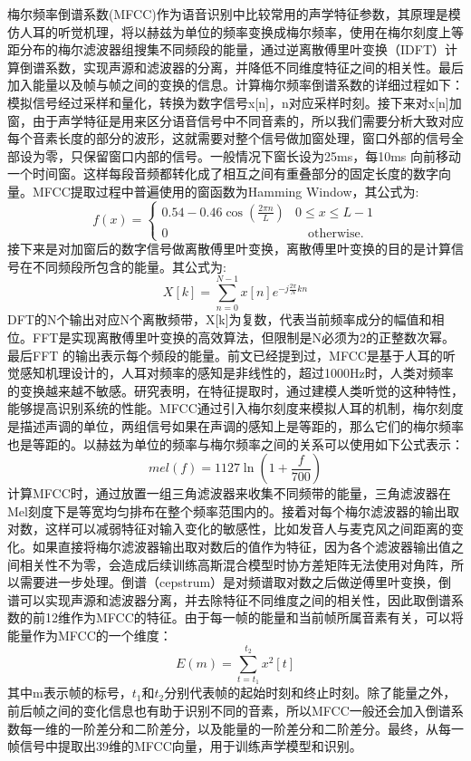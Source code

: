 梅尔频率倒谱系数(MFCC)作为语音识别中比较常用的声学特征参数，其原理是模仿人耳的听觉机理，将以赫兹为单位的频率变换成梅尔频率，使用在梅尔刻度上等距分布的梅尔滤波器组搜集不同频段的能量，通过逆离散傅里叶变换（IDFT）计算倒谱系数，实现声源和滤波器的分离，并降低不同维度特征之间的相关性。最后加入能量以及帧与帧之间的变换的信息。计算梅尔频率倒谱系数的详细过程如下：模拟信号经过采样和量化，转换为数字信号x[n]，n对应采样时刻。接下来对x[n]加窗，由于声学特征是用来区分语音信号中不同音素的，所以我们需要分析大致对应每个音素长度的部分的波形，这就需要对整个信号做加窗处理，窗口外部的信号全部设为零，只保留窗口内部的信号。一般情况下窗长设为25ms，每10ms 向前移动一个时间窗。这样每段音频都转化成了相互之间有重叠部分的固定长度的数字向量。MFCC提取过程中普遍使用的窗函数为Hamming Window，其公式为:
\begin{equation}
  f(x)=
    \begin{cases}
      0.54 - 0.46\cos(\frac{2{\pi}n}{L}) & 0\leq x\leq L-1 \\
      \text{0} &\quad\text{otherwise.} \
    \end{cases}
\end{equation}
接下来是对加窗后的数字信号做离散傅里叶变换，离散傅里叶变换的目的是计算信号在不同频段所包含的能量。其公式为:\begin{equation}X[k]=\sum_{n=0}^{N-1} x[n]{e^{-j\frac{2\pi}{N}k{n}}}\end{equation}DFT的N个输出对应N个离散频带，X[k]为复数，代表当前频率成分的幅值和相位。FFT是实现离散傅里叶变换的高效算法，但限制是N必须为2的正整数次幂。最后FFT 的输出表示每个频段的能量。前文已经提到过，MFCC是基于人耳的听觉感知机理设计的，人耳对频率的感知是非线性的，超过1000Hz时，人类对频率的变换越来越不敏感。研究表明，在特征提取时，通过建模人类听觉的这种特性，能够提高识别系统的性能\cite{davis1980comparison}。MFCC通过引入梅尔刻度来模拟人耳的机制，梅尔刻度\cite{stevens1940}是描述声调的单位，两组信号如果在声调的感知上是等距的，那么它们的梅尔频率也是等距的。以赫兹为单位的频率与梅尔频率之间的关系可以使用如下公式表示：\begin{equation}mel(f)=1127\ln(1+\frac{f}{700})\end{equation}计算MFCC时，通过放置一组三角滤波器来收集不同频带的能量，三角滤波器在Mel刻度下是等宽均匀排布在整个频率范围内的。接着对每个梅尔滤波器的输出取对数，这样可以减弱特征对输入变化的敏感性，比如发音人与麦克风之间距离的变化。如果直接将梅尔滤波器输出取对数后的值作为特征，因为各个滤波器输出值之间相关性不为零，会造成后续训练高斯混合模型时协方差矩阵无法使用对角阵，所以需要进一步处理。倒谱（cepstrum）是对频谱取对数之后做逆傅里叶变换，倒谱可以实现声源和滤波器分离，并去除特征不同维度之间的相关性，因此取倒谱系数的前12维作为MFCC的特征。由于每一帧的能量和当前帧所属音素有关，可以将能量作为MFCC的一个维度：\begin{equation}E(m) = \sum_{t=t_1}^{t_2} x^2[t]\end{equation}
其中m表示帧的标号，$t_1$和$t_2$分别代表帧的起始时刻和终止时刻。除了能量之外，前后帧之间的变化信息也有助于识别不同的音素，所以MFCC一般还会加入倒谱系数每一维的一阶差分和二阶差分，以及能量的一阶差分和二阶差分。最终，从每一帧信号中提取出39维的MFCC向量，用于训练声学模型和识别。
